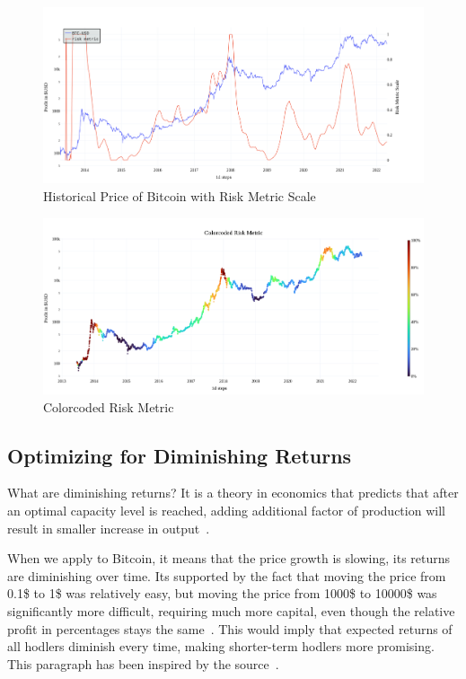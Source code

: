 \begin{figure}[!hbt]
    \centering
    \includegraphics[width=\columnwidth]{figures/50week-scale.png}
    \caption{Historical Price of Bitcoin with Risk Metric Scale}
    \label{figure-50week-scale}
\end{figure}

\begin{figure}[!hbt]
    \centering
    \includegraphics[width=\columnwidth]{figures/50week-colorcoded.png}
    \caption{Colorcoded Risk Metric}
    \label{figure-50week-colorcoded}
\end{figure}

\subsection*{Optimizing for Diminishing Returns}
\label{subsection-dimreturns}
What are diminishing returns? It is a theory in economics that predicts that after an optimal capacity level is reached, adding additional factor of production will result in smaller increase in output~\cite{investopedia:diminishing-returns}.

When we apply to Bitcoin, it means that the price growth is slowing, its returns are diminishing over time. Its supported by the fact that moving the price from 0.1\$ to 1\$ was relatively easy, but moving the price from 1000\$ to 10000\$ was significantly more difficult, requiring much more capital, even though the relative profit in percentages stays the same~\cite{bitcoin-diminishing-returns}. This would imply that expected returns of all hodlers diminish every time, making shorter-term hodlers more promising. This paragraph has been inspired by the source~\cite{bitcoin-diminishing-returns}.


